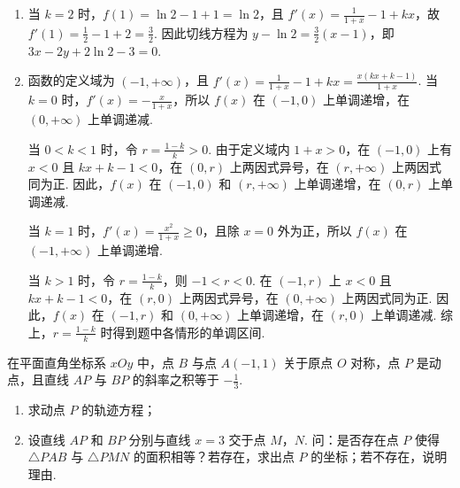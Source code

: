 \begin{solution}
\begin{enumerate}
\item 当 \(k=2\) 时，\(f(1)=\ln 2-1+1=\ln 2\)，且
\(f'(x)=\frac{1}{1+x}-1+kx\)，故 \(f'(1)=\frac{1}{2}-1+2=\frac{3}{2}\). 因此切线方程为 \(y-\ln 2=\frac{3}{2}(x-1)\)，即 \(3x-2y+2\ln 2-3=0\).

\item 函数的定义域为 \((-1,+\infty)\)，且
\(f'(x)=\frac{1}{1+x}-1+kx=\frac{x\left(kx+k-1\right)}{1+x}\).
当 \(k=0\) 时，\(f'(x)=-\frac{x}{1+x}\)，所以 \(f(x)\) 在 \((-1,0)\) 上单调递增，在 \((0,+\infty)\) 上单调递减.

当 \(0<k<1\) 时，令 \(r=\frac{1-k}{k}>0\). 由于定义域内 \(1+x>0\)，在 \((-1,0)\) 上有 \(x<0\) 且 \(kx+k-1<0\)，在 \((0,r)\) 上两因式异号，在 \((r,+\infty)\) 上两因式同为正. 因此，\(f(x)\) 在 \((-1,0)\) 和 \((r,+\infty)\) 上单调递增，在 \((0,r)\) 上单调递减.

当 \(k=1\) 时，\(f'(x)=\frac{x^{2}}{1+x}\geqslant0\)，且除 \(x=0\) 外为正，所以 \(f(x)\) 在 \((-1,+\infty)\) 上单调递增.

当 \(k>1\) 时，令 \(r=\frac{1-k}{k}\)，则 \(-1<r<0\). 在 \((-1,r)\) 上 \(x<0\) 且 \(kx+k-1<0\)，在 \((r,0)\) 上两因式异号，在 \((0,+\infty)\) 上两因式同为正. 因此，\(f(x)\) 在 \((-1,r)\) 和 \((0,+\infty)\) 上单调递增，在 \((r,0)\) 上单调递减. 综上，\(r=\frac{1-k}{k}\) 时得到题中各情形的单调区间.
\end{enumerate}
\end{solution}

\begin{problem}
在平面直角坐标系 \(xOy\) 中，点 \(B\) 与点 \(A(-1,1)\) 关于原点 \(O\) 对称，点 \(P\) 是动点，且直线 \(AP\) 与 \(BP\) 的斜率之积等于 \(-\frac{1}{3}\).
\begin{enumerate}
\item 求动点 \(P\) 的轨迹方程；
\item 设直线 \(AP\) 和 \(BP\) 分别与直线 \(x = 3\) 交于点 \(M\)，\(N\). 问：是否存在点 \(P\) 使得 \(\triangle PAB\) 与 \(\triangle PMN\) 的面积相等？若存在，求出点 \(P\) 的坐标；若不存在，说明理由.
\end{enumerate}
\end{problem}


